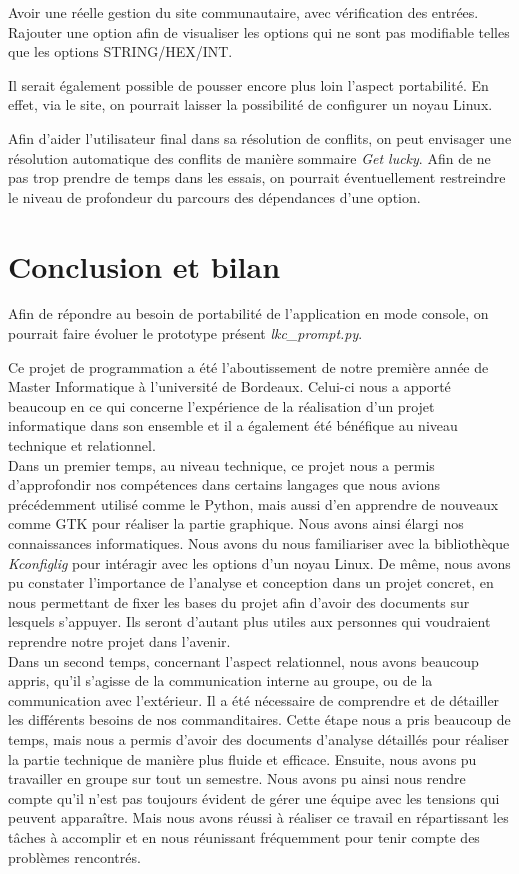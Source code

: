 \documentclass[17pts]{report}
\begin{document}
Avoir une réelle gestion du site communautaire, avec vérification des entrées.
Rajouter une option afin de visualiser les options qui ne sont pas modifiable
telles que les options STRING/HEX/INT.

Il serait également possible de pousser encore plus loin l'aspect portabilité.
En effet, via le site, on pourrait laisser la possibilité de configurer un
noyau Linux.

Afin d'aider l'utilisateur final dans sa résolution de conflits, on peut
envisager une résolution automatique des conflits de manière sommaire
\textit{Get lucky}.  Afin de ne pas trop prendre de temps dans les essais, on
pourrait éventuellement restreindre le niveau de profondeur du parcours des
dépendances d'une option.

\chapter{Conclusion et bilan}\thispagestyle{IHA-fancy-style}
Afin de répondre au besoin de portabilité de l'application en mode console,
on pourrait faire évoluer le prototype présent \textit{lkc\_prompt.py}.

\label{cha:Conclusion et bilan}
Ce projet de programmation a été l'aboutissement de notre première année de
Master Informatique à l'université de Bordeaux. Celui-ci nous a apporté
beaucoup en ce qui concerne l'expérience de la réalisation d'un projet
informatique dans son ensemble et il a également été bénéfique au niveau
technique et relationnel.\\

Dans un premier temps, au niveau technique, ce projet nous a permis
d'approfondir nos compétences dans certains langages que nous avions
précédemment utilisé comme le Python, mais aussi d'en apprendre de nouveaux
comme GTK pour réaliser la partie graphique. Nous avons ainsi élargi nos
connaissances informatiques. Nous avons du nous familiariser avec la
bibliothèque \textit{Kconfiglig} pour intéragir avec les options d'un noyau
Linux. De même, nous avons pu constater l'importance de l'analyse et conception
dans un projet concret, en nous permettant de fixer les bases du projet afin
d'avoir des documents sur lesquels s'appuyer. Ils seront d'autant plus utiles
aux personnes qui voudraient reprendre notre projet dans l'avenir.\\

Dans un second temps, concernant l'aspect relationnel, nous avons beaucoup
appris, qu'il s'agisse de la communication interne au groupe, ou de la
communication avec l'extérieur. Il a été nécessaire de comprendre et de
détailler les différents besoins de nos commanditaires. Cette étape nous a pris
beaucoup de temps, mais nous a permis d'avoir des documents d'analyse détaillés
pour réaliser la partie technique de manière plus fluide et efficace.  Ensuite,
nous avons pu travailler en groupe sur tout un semestre. Nous avons pu ainsi
nous rendre compte qu'il n'est pas toujours évident de gérer une équipe avec
les tensions qui peuvent apparaître. Mais nous avons réussi à réaliser ce
travail en répartissant les tâches à accomplir et en nous réunissant
fréquemment pour tenir compte des problèmes rencontrés.\\
\end{document}
